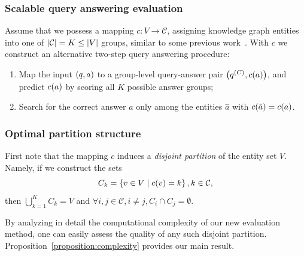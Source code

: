 \subsubsection{Scalable query answering evaluation}
 Assume that we possess a mapping $c: V \to \mathcal{C}$, assigning knowledge graph entities into one of $\mathopen{}\left|\mathcal{C}\right| = K \leq \mathopen{}\left|V\right|$  groups, similar to some previous work~\cite{lerer_pytorch-biggraph_2019,zheng_dgl-ke_2020}. 
With $c$ we construct an alternative two-step query answering procedure:
 \begin{enumerate}
     \item Map the input $\mathopen{}\left(q, a\right)$ to a group-level query-answer pair $\mathopen{}\left(q^{\mathopen{}\left(C\right)}, c\mathopen{}\left(a\right)\right)$, and predict $c\mathopen{}\left(a\right)$ by scoring all $K$ possible answer groups;%
     \item Search for the correct answer $a$ only among the entities $\hat{a}$ with $c\mathopen{}\left(\hat{a}\right)=c\mathopen{}\left(a\right)$.
 \end{enumerate}

\subsubsection{Optimal partition structure}

First note that the mapping $c$ induces a \emph{disjoint partition} of the entity set $V$. Namely, if we construct the sets $$C_k = \mathopen{}\left\{v \in V \mid c\mathopen{}\left(v\right)=k\right\}, k \in \mathcal{C},$$ then $\bigcup_{k=1}^{K}{C_k}=V$ and $\forall i,j \in \mathcal{C},i \neq j, C_i \cap C_j = \emptyset$. 

By analyzing in detail the computational complexity of our new evaluation method, one can easily assess the quality of any such disjoint partition. Proposition~\ref{proposition:complexity} provides our main result. 

